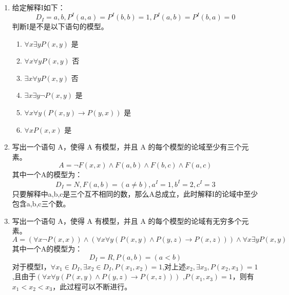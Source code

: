 \documentclass[UTF8]{ctexart}
\begin{document}
\begin{enumerate}
        \item 给定解释I如下：
        \[
            D_I={a,b},P^I(a,a)=P^I(b,b)=1,P^I(a,b)=P^I(b,a)=0
        \]
        判断I是不是以下语句的模型。
        \begin{enumerate}
            \item $\forall x \exists yP(x,y)$  是
            \item $\forall x \forall y P(x,y)$ 否
            \item $\exists x \forall y P(x,y)$ 否
            \item $\exists x \exists y \neg P(x,y)$ 是
            \item $\forall x \forall y (P(x,y)\rightarrow P(y,x))$ 是
            \item $\forall x P(x,x)$ 是
        \end{enumerate}
        \item 写出一个语句 A，使得 A 有模型，并且 A 的每个模型的论域至少有三个元素。
        \[
            A=\neg F(x,x) \wedge F(a,b) \wedge F(b,c) \wedge F(a,c)
        \]
        其中一个A的模型为：
        \[
            D_I=N,F(a,b)=(a\neq b),a^I=1,b^I=2,c^I=3
        \]
        只要解释中a,b,c是三个互不相同的数，那么A总成立，此时解释I的论域中至少包含a,b,c三个数。

        \item 写出一个语句 A，使得 A 有模型，并且 A 的每个模型的论域有无穷多个元素。
        \[
            A=(\forall x \neg P(x,x)) \wedge (\forall x \forall y (P(x,y)\wedge P(y,z)\rightarrow P(x,z))) \wedge \forall x \exists y P(x,y)
        \]
        其中一个A的模型为：
        \[
            D_I=R,P(a,b)=(a<b)
        \]
        对于模型I，$\forall x_1\in D_I,\exists x_2\in D_I,P(x_1,x_2)=1$,对上述$x_2,\exists x_3,P(x_2,x_3)=1$,且由于$(\forall x \forall y (P(x,y)\wedge P(y,z)\rightarrow P(x,z)))$
        ,$P(x_1,x_3)=1$，则有$x_1<x_2<x_3$，此过程可以不断进行。
    \end{enumerate}
\end{document}
